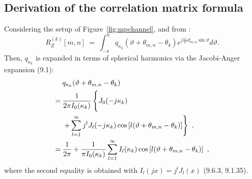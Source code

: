 \documentclass[journal,10pt]{IEEEtran}
\begin{document}
\subsection{Derivation of the correlation matrix formula}
Considering the setup of Figure~\ref{fig:mpchannel}, and from \cite{Salz1994}:
$$R_Z^{(k)}[m,n]\:=\:\int_{-\pi}^{\pi} q_{\kappa_k}(\vartheta+\theta_{m,n}-\theta_k) e^{j\frac{\omega_c}{c}d_{m,n}\sin\vartheta}d\vartheta.$$
Then, $q_{\kappa_k}$ is expanded in terms of spherical harmonics via the Jacobi-Anger expansion \cite{Abramowitz1964}(9.1): \begin{align*}& q_{\kappa_k}(\vartheta+\theta_{m,n}-\theta_k)\\=\: &\frac{1}{2\pi I_0(\kappa_k)}\left\lbrace J_0(-j\kappa_k)\vphantom{\sum_{l=1}^\infty}\right.\\
&\left.+\sum_{l=1}^\infty j^lJ_l(-j\kappa_k) \cos\left[l(\vartheta+\theta_{m,n}-\theta_k)\right]\right\rbrace\ ,\\
=\: &\frac{1}{2\pi}+\frac{1}{\pi I_0(\kappa_k)}\sum_{l=1}^\infty I_l(\kappa_k) \cos\left[l(\vartheta+\theta_{m,n}-\theta_k)\right]\ ,
\end{align*}
where the second equality is obtained with $I_l(jx)=j^lJ_l(x)$ \cite{Abramowitz1964}(9.6.3, 9.1.35).
\end{document}
